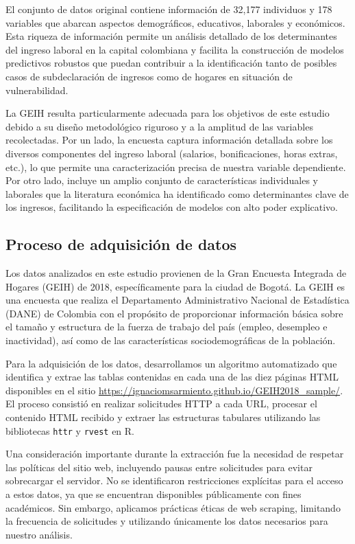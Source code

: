 \documentclass[12pt,a4paper,onecolumn]{article}
\begin{document}
El conjunto de datos original contiene información de 32,177 individuos y 178 variables que abarcan aspectos demográficos, educativos, laborales y económicos. Esta riqueza de información permite un análisis detallado de los determinantes del ingreso laboral en la capital colombiana y facilita la construcción de modelos predictivos robustos que puedan contribuir a la identificación tanto de posibles casos de subdeclaración de ingresos como de hogares en situación de vulnerabilidad.


La GEIH resulta particularmente adecuada para los objetivos de este estudio debido a su diseño metodológico riguroso y a la amplitud de las variables recolectadas. Por un lado, la encuesta captura información detallada sobre los diversos componentes del ingreso laboral (salarios, bonificaciones, horas extras, etc.), lo que permite una caracterización precisa de nuestra variable dependiente. Por otro lado, incluye un amplio conjunto de características individuales y laborales que la literatura económica ha identificado como determinantes clave de los ingresos, facilitando la especificación de modelos con alto poder explicativo.


\subsection{Proceso de adquisición de datos}

Los datos analizados en este estudio provienen de la Gran Encuesta Integrada de Hogares (GEIH) de 2018, específicamente para la ciudad de Bogotá. La GEIH es una encuesta que realiza el Departamento Administrativo Nacional de Estadística (DANE) de Colombia con el propósito de proporcionar información básica sobre el tamaño y estructura de la fuerza de trabajo del país (empleo, desempleo e inactividad), así como de las características sociodemográficas de la población.


Para la adquisición de los datos, desarrollamos un algoritmo automatizado que identifica y extrae las tablas contenidas en cada una de las diez páginas HTML disponibles en el sitio \url{https://ignaciomsarmiento.github.io/GEIH2018_sample/}. El proceso consistió en realizar solicitudes HTTP a cada URL, procesar el contenido HTML recibido y extraer las estructuras tabulares utilizando las bibliotecas \texttt{httr} y \texttt{rvest} en R.


Una consideración importante durante la extracción fue la necesidad de respetar las políticas del sitio web, incluyendo pausas entre solicitudes para evitar sobrecargar el servidor. No se identificaron restricciones explícitas para el acceso a estos datos, ya que se encuentran disponibles públicamente con fines académicos. Sin embargo, aplicamos prácticas éticas de web scraping, limitando la frecuencia de solicitudes y utilizando únicamente los datos necesarios para nuestro análisis.
\end{document}
